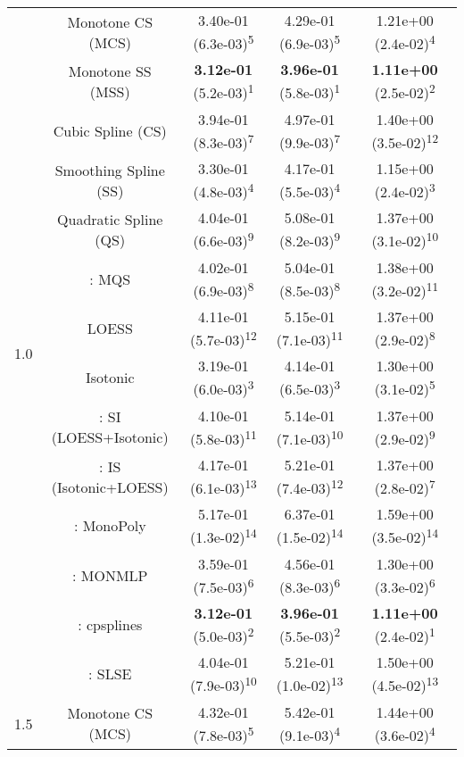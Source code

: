 \begin{tabular}{ccccc}
\midrule
\multirow{14}{*}{1.0}&Monotone CS (MCS)& 3.40e-01 (6.3e-03)\textsuperscript{5}& 4.29e-01 (6.9e-03)\textsuperscript{5}& 1.21e+00 (2.4e-02)\textsuperscript{4}\tabularnewline
&Monotone SS (MSS)& \textbf{3.12e-01} (5.2e-03)\textsuperscript{1}& \textbf{3.96e-01} (5.8e-03)\textsuperscript{1}& \textbf{1.11e+00} (2.5e-02)\textsuperscript{2}\tabularnewline
&Cubic Spline (CS)& 3.94e-01 (8.3e-03)\textsuperscript{7}& 4.97e-01 (9.9e-03)\textsuperscript{7}& 1.40e+00 (3.5e-02)\textsuperscript{12}\tabularnewline
&Smoothing Spline (SS)& 3.30e-01 (4.8e-03)\textsuperscript{4}& 4.17e-01 (5.5e-03)\textsuperscript{4}& 1.15e+00 (2.4e-02)\textsuperscript{3}\tabularnewline
&Quadratic Spline (QS)& 4.04e-01 (6.6e-03)\textsuperscript{9}& 5.08e-01 (8.2e-03)\textsuperscript{9}& 1.37e+00 (3.1e-02)\textsuperscript{10}\tabularnewline
&\textcite{heMonotoneBsplineSmoothing1998}: MQS& 4.02e-01 (6.9e-03)\textsuperscript{8}& 5.04e-01 (8.5e-03)\textsuperscript{8}& 1.38e+00 (3.2e-02)\textsuperscript{11}\tabularnewline
&LOESS& 4.11e-01 (5.7e-03)\textsuperscript{12}& 5.15e-01 (7.1e-03)\textsuperscript{11}& 1.37e+00 (2.9e-02)\textsuperscript{8}\tabularnewline
&Isotonic& 3.19e-01 (6.0e-03)\textsuperscript{3}& 4.14e-01 (6.5e-03)\textsuperscript{3}& 1.30e+00 (3.1e-02)\textsuperscript{5}\tabularnewline
&\textcite{mammenEstimatingSmoothMonotone1991}: SI (LOESS+Isotonic)& 4.10e-01 (5.8e-03)\textsuperscript{11}& 5.14e-01 (7.1e-03)\textsuperscript{10}& 1.37e+00 (2.9e-02)\textsuperscript{9}\tabularnewline
&\textcite{mammenEstimatingSmoothMonotone1991}: IS (Isotonic+LOESS)& 4.17e-01 (6.1e-03)\textsuperscript{13}& 5.21e-01 (7.4e-03)\textsuperscript{12}& 1.37e+00 (2.8e-02)\textsuperscript{7}\tabularnewline
&\textcite{murrayFastFlexibleMethods2016}: MonoPoly& 5.17e-01 (1.3e-02)\textsuperscript{14}& 6.37e-01 (1.5e-02)\textsuperscript{14}& 1.59e+00 (3.5e-02)\textsuperscript{14}\tabularnewline
&\textcite{cannonMonmlpMultilayerPerceptron2017}: MONMLP& 3.59e-01 (7.5e-03)\textsuperscript{6}& 4.56e-01 (8.3e-03)\textsuperscript{6}& 1.30e+00 (3.3e-02)\textsuperscript{6}\tabularnewline
&\textcite{navarro-garciaConstrainedSmoothingOutofrange2023}: cpsplines& \textbf{3.12e-01} (5.0e-03)\textsuperscript{2}& \textbf{3.96e-01} (5.5e-03)\textsuperscript{2}& \textbf{1.11e+00} (2.4e-02)\textsuperscript{1}\tabularnewline
&\textcite{groeneboomConfidenceIntervalsMonotone2023}: SLSE& 4.04e-01 (7.9e-03)\textsuperscript{10}& 5.21e-01 (1.0e-02)\textsuperscript{13}& 1.50e+00 (4.5e-02)\textsuperscript{13}\tabularnewline
\midrule
\multirow{14}{*}{1.5}&Monotone CS (MCS)& 4.32e-01 (7.8e-03)\textsuperscript{5}& 5.42e-01 (9.1e-03)\textsuperscript{4}& 1.44e+00 (3.6e-02)\textsuperscript{4}\tabularnewline

\end{tabular}
